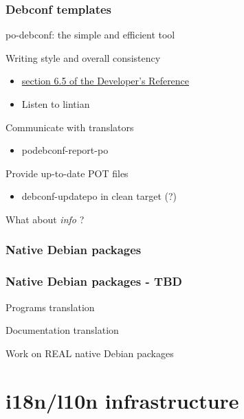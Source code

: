 \documentclass{beamer}
\begin{document}
\begin{frame}
  \frametitle{Debconf templates}
	\begin{block}
		{po-debconf: the simple and efficient tool}
	\end{block}
	\begin{block}
		{Writing style and overall consistency}
		\begin{itemize}
		\item
			\href{http://www.debian.org/doc/developers-reference/ch-best-pkging-practices.html\#s-bpp-config-mgmt}{section 6.5 of the Developer's Reference}
		\item
			Listen to lintian
		\end{itemize}
	\end{block}
	\begin{block}
		{Communicate with translators}
		\begin{itemize}
		\item
			podebconf-report-po
		\end{itemize}
	\end{block}
	\begin{block}
		{Provide up-to-date POT files}
		\begin{itemize}
		\item
			debconf-updatepo in clean target (?)
		\end{itemize}
	\end{block}
	\begin{block}
		{What about {\em info} ?}
	\end{block}
\end{frame}

\subsubsection{Native Debian packages}

\begin{frame}
  \frametitle{Native Debian packages - TBD}
	\begin{block}
		{Programs translation}
	\end{block}
	\begin{block}
		{Documentation translation}
	\end{block}
	\begin{block}
		{Work on REAL native Debian packages}
	\end{block}
\end{frame}



\section{i18n/l10n infrastructure}
\end{document}
